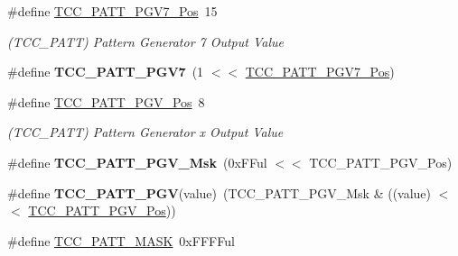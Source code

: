 \begin{DoxyCompactItemize}
\item 
\hypertarget{group___s_a_m_l21___t_c_c_gab36b0c4f5997aed62eb471bce32f3c6a}{}\#define \hyperlink{group___s_a_m_l21___t_c_c_gab36b0c4f5997aed62eb471bce32f3c6a}{T\+C\+C\+\_\+\+P\+A\+T\+T\+\_\+\+P\+G\+V7\+\_\+\+Pos}~15\label{group___s_a_m_l21___t_c_c_gab36b0c4f5997aed62eb471bce32f3c6a}

\begin{DoxyCompactList}\small\item\em (T\+C\+C\+\_\+\+P\+A\+T\+T) Pattern Generator 7 Output Value \end{DoxyCompactList}\item 
\hypertarget{group___s_a_m_l21___t_c_c_gab61b5a8333eb2f43e823e2f5bf82a616}{}\#define {\bfseries T\+C\+C\+\_\+\+P\+A\+T\+T\+\_\+\+P\+G\+V7}~(1 $<$$<$ \hyperlink{group___s_a_m_l21___t_c_c_gab36b0c4f5997aed62eb471bce32f3c6a}{T\+C\+C\+\_\+\+P\+A\+T\+T\+\_\+\+P\+G\+V7\+\_\+\+Pos})\label{group___s_a_m_l21___t_c_c_gab61b5a8333eb2f43e823e2f5bf82a616}

\item 
\hypertarget{group___s_a_m_l21___t_c_c_gaaa5f36bba630fdca5a3304208736b8b9}{}\#define \hyperlink{group___s_a_m_l21___t_c_c_gaaa5f36bba630fdca5a3304208736b8b9}{T\+C\+C\+\_\+\+P\+A\+T\+T\+\_\+\+P\+G\+V\+\_\+\+Pos}~8\label{group___s_a_m_l21___t_c_c_gaaa5f36bba630fdca5a3304208736b8b9}

\begin{DoxyCompactList}\small\item\em (T\+C\+C\+\_\+\+P\+A\+T\+T) Pattern Generator x Output Value \end{DoxyCompactList}\item 
\hypertarget{group___s_a_m_l21___t_c_c_ga33362ef86bda5bf67fed640168a6d78c}{}\#define {\bfseries T\+C\+C\+\_\+\+P\+A\+T\+T\+\_\+\+P\+G\+V\+\_\+\+Msk}~(0x\+F\+Ful $<$$<$ T\+C\+C\+\_\+\+P\+A\+T\+T\+\_\+\+P\+G\+V\+\_\+\+Pos)\label{group___s_a_m_l21___t_c_c_ga33362ef86bda5bf67fed640168a6d78c}

\item 
\hypertarget{group___s_a_m_l21___t_c_c_ga52b83b7074edc7d4e2b3c9ab1753ed6d}{}\#define {\bfseries T\+C\+C\+\_\+\+P\+A\+T\+T\+\_\+\+P\+G\+V}(value)~(T\+C\+C\+\_\+\+P\+A\+T\+T\+\_\+\+P\+G\+V\+\_\+\+Msk \& ((value) $<$$<$ \hyperlink{group___s_a_m_l21___t_c_c_gaaa5f36bba630fdca5a3304208736b8b9}{T\+C\+C\+\_\+\+P\+A\+T\+T\+\_\+\+P\+G\+V\+\_\+\+Pos}))\label{group___s_a_m_l21___t_c_c_ga52b83b7074edc7d4e2b3c9ab1753ed6d}

\item 
\hypertarget{group___s_a_m_l21___t_c_c_gac253c5d2e417b311dfbb184323e297e8}{}\#define \hyperlink{group___s_a_m_l21___t_c_c_gac253c5d2e417b311dfbb184323e297e8}{T\+C\+C\+\_\+\+P\+A\+T\+T\+\_\+\+M\+A\+S\+K}~0x\+F\+F\+F\+Ful\label{group___s_a_m_l21___t_c_c_gac253c5d2e417b311dfbb184323e297e8}


\end{DoxyCompactItemize}
